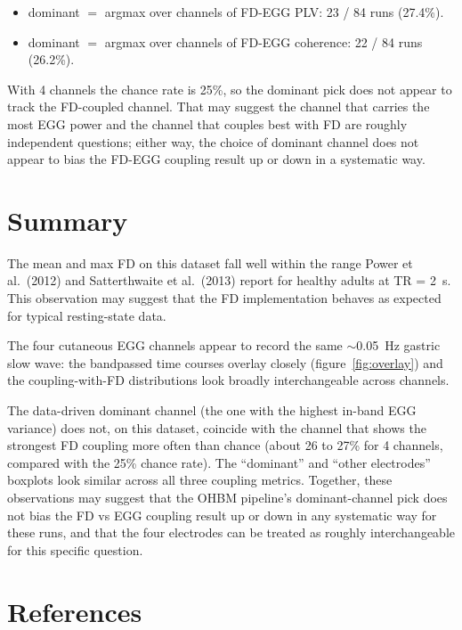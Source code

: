 \documentclass[11pt]{article}
\begin{document}
\begin{itemize}
\item dominant $=$ argmax over channels of FD-EGG PLV: 23 / 84 runs
(27.4\%).
\item dominant $=$ argmax over channels of FD-EGG coherence: 22 / 84
runs (26.2\%).
\end{itemize}

With 4 channels the chance rate is 25\%, so the dominant pick does not
appear to track the FD-coupled channel. That may suggest the channel
that carries the most EGG power and the channel that couples best
with FD are roughly independent questions; either way, the choice of
dominant channel does not appear to bias the FD-EGG coupling result up
or down in a systematic way.

\section{Summary}

The mean and max FD on this dataset fall well within the range
Power et al.\ (2012) and Satterthwaite et al.\ (2013) report for
healthy adults at TR = 2~s. This observation may suggest that the FD
implementation behaves as expected for typical resting-state data.

The four cutaneous EGG channels appear to record the same $\sim$0.05~Hz
gastric slow wave: the bandpassed time courses overlay closely
(figure~\ref{fig:overlay}) and the coupling-with-FD distributions look
broadly interchangeable across channels.

The data-driven dominant channel (the one with the highest in-band EGG
variance) does not, on this dataset, coincide with the channel that
shows the strongest FD coupling more often than chance (about 26 to
27\% for 4 channels, compared with the 25\% chance rate). The
``dominant'' and ``other electrodes'' boxplots look similar across all
three coupling metrics. Together, these observations may suggest that
the OHBM pipeline's dominant-channel pick does not bias the FD vs EGG
coupling result up or down in any systematic way for these runs, and
that the four electrodes can be treated as roughly interchangeable for
this specific question.


\section*{References}
\end{document}
